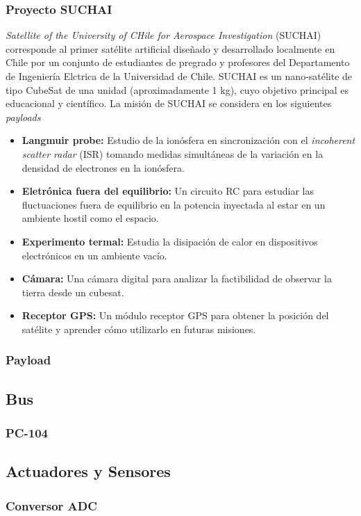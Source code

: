 \documentclass[11pt,letterpaper]{article}
\begin{document}
\subsubsection{Proyecto SUCHAI}
  \textit{Satellite of the University of CHile for Aerospace Investigation} (SUCHAI) corresponde al primer sat\'elite artificial diseñado y desarrollado localmente en Chile por un conjunto de estudiantes de pregrado y profesores del Departamento de Ingeniería Elctrica de la Universidad de Chile.
SUCHAI es un nano-sat\'elite de tipo CubeSat de una unidad (aproximadamente 1 kg), cuyo objetivo principal es educacional y científico.
La misión de SUCHAI se considera en los siguientes \textit{payloads}
\begin{itemize}
\item \textbf{Langmuir probe: } Estudio de la ionósfera en sincronización con el \textit{incoherent scatter radar} (ISR) tomando medidas simultáneas de la variación en la densidad de electrones en la ionósfera.
\item \textbf{Eletrónica fuera del equilibrio: } Un circuito RC para estudiar las fluctuaciones fuera de equilibrio en la potencia inyectada al estar en un ambiente hostil como el espacio.
\item \textbf{Experimento termal: } Estudia la disipación de calor en dispositivos electrónicos en un ambiente vacío.
\item \textbf{Cámara: } Una cámara digital para analizar la factibilidad de observar la tierra desde un cubesat.
\item \textbf{Receptor GPS: } Un módulo receptor GPS para obtener la posición del sat\'elite y aprender cómo utilizarlo en futuras misiones.
\end{itemize}

\subsubsection{Payload}
\subsection{Bus}
\subsubsection{PC-104}
\subsection{Actuadores y Sensores}
\subsubsection{Conversor ADC}
\end{document}
